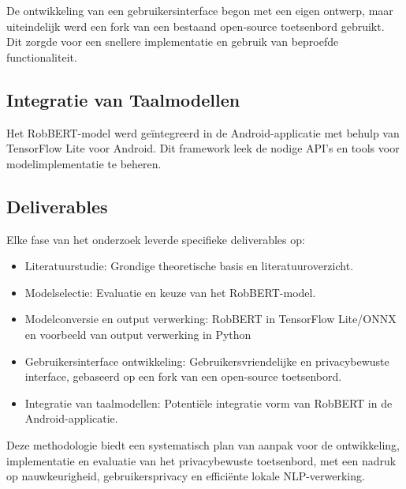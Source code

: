 De ontwikkeling van een gebruikersinterface begon met een eigen ontwerp, maar uiteindelijk werd een fork van een bestaand open-source toetsenbord gebruikt. Dit zorgde voor een snellere implementatie en gebruik van beproefde functionaliteit.

\subsection{Integratie van Taalmodellen}

Het RobBERT-model werd geïntegreerd in de Android-applicatie met behulp van TensorFlow Lite voor Android. Dit framework leek de nodige API's en tools voor modelimplementatie te beheren\autocite{ulukaya2023}.

\subsection{Deliverables}

Elke fase van het onderzoek leverde specifieke deliverables op:
\begin{itemize}
    \item Literatuurstudie: Grondige theoretische basis en literatuuroverzicht.
    \item Modelselectie: Evaluatie en keuze van het RobBERT-model.
    \item Modelconversie en output verwerking: RobBERT in TensorFlow Lite/ONNX en voorbeeld van output verwerking in Python
    \item Gebruikersinterface ontwikkeling: Gebruikersvriendelijke en privacybewuste interface, gebaseerd op een fork van een open-source toetsenbord.
    \item Integratie van taalmodellen: Potentiële integratie vorm van RobBERT in de Android-applicatie.
\end{itemize}

Deze methodologie biedt een systematisch plan van aanpak voor de ontwikkeling, implementatie en evaluatie van het privacybewuste toetsenbord, met een nadruk op nauwkeurigheid, gebruikersprivacy en efficiënte lokale NLP-verwerking.